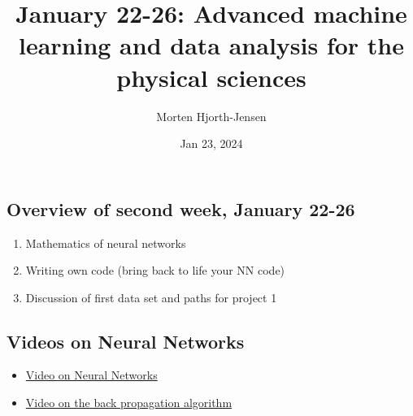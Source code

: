 \documentclass[%
oneside,                 %
final,                   %
10pt]{article}
\begin{document}

\newcommand{\exercisesection}[1]{\subsection*{#1}}






\title{January 22-26: Advanced machine learning and data analysis for the physical sciences}


\author{Morten Hjorth-Jensen}

\date{Jan 23, 2024
}

\subsection{Overview of second  week, January 22-26}

\begin{block}{}
\begin{enumerate}
 \item Mathematics of neural networks

 \item Writing own code (bring back to life your NN code)

 \item Discussion of first data set and paths for project 1
\end{enumerate}

\noindent
\end{block}

\subsection{Videos on Neural Networks}

\begin{itemize}
\item \href{{https://www.youtube.com/watch?v=CqOfi41LfDw}}{Video on Neural Networks}

\item \href{{https://www.youtube.com/watch?v=Ilg3gGewQ5U}}{Video on the back propagation algorithm}
\end{itemize}
\end{document}

